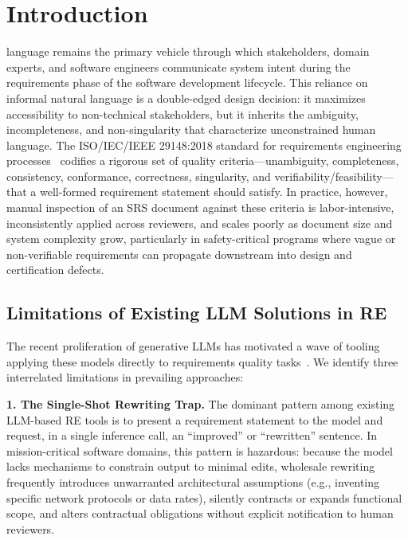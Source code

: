 \documentclass[journal]{IEEEtran}
\begin{document}
\section{Introduction}
\label{sec:introduction}

 language remains the primary vehicle through which stakeholders, domain experts, and software engineers communicate system intent during the requirements phase of the software development lifecycle. This reliance on informal natural language is a double-edged design decision: it maximizes accessibility to non-technical stakeholders, but it inherits the ambiguity, incompleteness, and non-singularity that characterize unconstrained human language. The ISO/IEC/IEEE 29148:2018 standard for requirements engineering processes~\cite{iso29148} codifies a rigorous set of quality criteria---unambiguity, completeness, consistency, conformance, correctness, singularity, and verifiability/feasibility---that a well-formed requirement statement should satisfy. In practice, however, manual inspection of an SRS document against these criteria is labor-intensive, inconsistently applied across reviewers, and scales poorly as document size and system complexity grow, particularly in safety-critical programs where vague or non-verifiable requirements can propagate downstream into design and certification defects.

\subsection{Limitations of Existing LLM Solutions in RE}
\label{sec:limitations}

The recent proliferation of generative LLMs has motivated a wave of tooling applying these models directly to requirements quality tasks~\cite{ronanki2023requirements}. We identify three interrelated limitations in prevailing approaches:

\textbf{1. The Single-Shot Rewriting Trap.} The dominant pattern among existing LLM-based RE tools is to present a requirement statement to the model and request, in a single inference call, an ``improved'' or ``rewritten'' sentence. In mission-critical software domains, this pattern is hazardous: because the model lacks mechanisms to constrain output to minimal edits, wholesale rewriting frequently introduces unwarranted architectural assumptions (e.g., inventing specific network protocols or data rates), silently contracts or expands functional scope, and alters contractual obligations without explicit notification to human reviewers.
\end{document}
